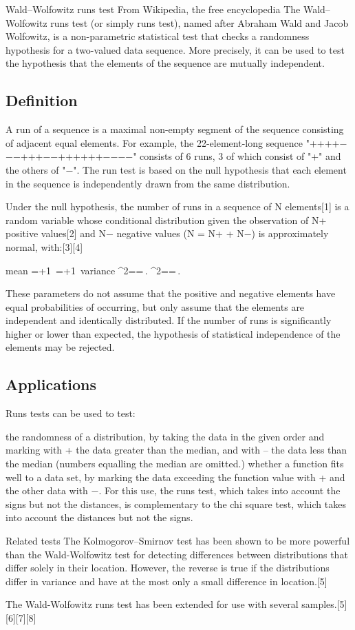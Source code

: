 Wald–Wolfowitz runs test
From Wikipedia, the free encyclopedia
The Wald–Wolfowitz runs test (or simply runs test), named after Abraham Wald and Jacob Wolfowitz, is a non-parametric statistical test that checks a randomness hypothesis for a two-valued data sequence. More precisely, it can be used to test the hypothesis that the elements of the sequence are mutually independent.

\subsection*{Definition}
A run of a sequence is a maximal non-empty segment of the sequence consisting of adjacent equal elements. For example, the 22-element-long sequence "++++−−−+++−−++++++−−−−" consists of 6 runs, 3 of which consist of "+" and the others of "−". The run test is based on the null hypothesis that each element in the sequence is independently drawn from the same distribution.

Under the null hypothesis, the number of runs in a sequence of N elements[1] is a random variable whose conditional distribution given the observation of N+ positive values[2] and N− negative values (N = N+ + N−) is approximately normal, with:[3][4]

mean {\displaystyle \mu ={}+1\,} \mu ={}+1\,
variance {\displaystyle \sigma ^{2}={}={}\,.} \sigma ^{2}={}={}\,.

These parameters do not assume that the positive and negative elements have equal probabilities of occurring, but only assume that the elements are independent and identically distributed. If the number of runs is significantly higher or lower than expected, the hypothesis of statistical independence of the elements may be rejected.

\subsection*{Applications}
Runs tests can be used to test:

the randomness of a distribution, by taking the data in the given order and marking with + the data greater than the median, and with – the data less than the median (numbers equalling the median are omitted.)
whether a function fits well to a data set, by marking the data exceeding the function value with + and the other data with −. For this use, the runs test, which takes into account the signs but not the distances, is complementary to the chi square test, which takes into account the distances but not the signs.

Related tests
The Kolmogorov–Smirnov test has been shown to be more powerful than the Wald-Wolfowitz test for detecting differences between distributions that differ solely in their location. However, the reverse is true if the distributions differ in variance and have at the most only a small difference in location.[5]

The Wald-Wolfowitz runs test has been extended for use with several samples.[5][6][7][8]
